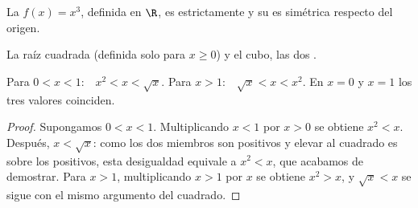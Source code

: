 \begin{proposition}\label{prop:g10:reffunc:cube}
La  $f(x) = x^3$, definida en $\R$, es estrictamente  y su
 es simétrica respecto del origen.
\end{proposition}
\admitted

\begin{omfigure}
\hfill
{}

{\small La raíz cuadrada (definida solo para $x \geq 0$) y el cubo, las dos
.}
\end{omfigure}

\begin{proposition}\label{prop:g10:reffunc:compare}
Para $0 < x < 1$:\ \ $x^2 < x < \sqrt x$.\quad
Para $x > 1$:\ \ $\sqrt x < x < x^2$.\quad
En $x = 0$ y $x = 1$ los tres valores coinciden.
\end{proposition}

\begin{proof}
Supongamos $0 < x < 1$. Multiplicando $x < 1$ por $x > 0$ se obtiene
$x^2 < x$. Después, $x < \sqrt x$: como los dos miembros son positivos y
elevar al cuadrado es  sobre los positivos, esta desigualdad
equivale a $x^2 < x$, que acabamos de demostrar. Para $x > 1$,
multiplicando $x > 1$ por $x$ se obtiene $x^2 > x$, y $\sqrt x < x$ se
sigue con el mismo argumento del cuadrado.
\end{proof}

